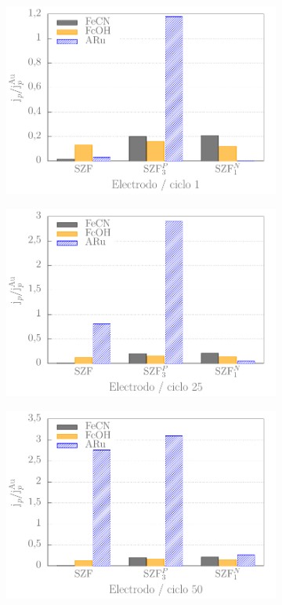 			\begin{figure}[b!]
			\centering
			\begin{subfigure}[t]{0.495\textwidth}
		 	 \includegraphics[width=\textwidth]{Graficos/histogramas-ciclo1.pdf}
		 	  \end{subfigure}
		 	\begin{subfigure}[t]{0.495\textwidth}
		 	 \includegraphics[width=\textwidth]{Graficos/histogramas-ciclo25.pdf}
		 	  \end{subfigure}
			\begin{subfigure}[t]{0.495\textwidth}
		 	   \includegraphics[width=\textwidth]{Graficos/histogramas-ciclo50.pdf}

\end{subfigure}
\end{figure}

